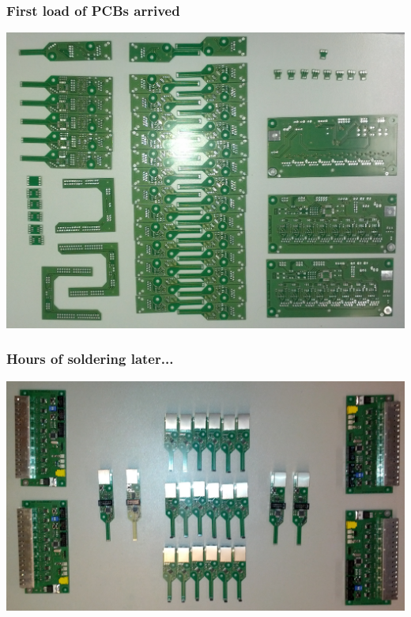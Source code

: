 \documentclass[t]{beamer}
\begin{document}
\begin{frame}[c]
    \frametitle{First load of PCBs arrived}
  \begin{center}
  	\includegraphics[width=0.8\linewidth]{img/pic/platinen_leer.jpg}\\
  \vspace{0.5cm}
  \end{center}
\end{frame}
\begin{frame}[c]
    \frametitle{Hours of soldering later...}
  \begin{center}
  	\includegraphics[width=0.8\linewidth]{img/pic/platinen_geloetet.jpg}\\
  \vspace{0.5cm}
  \end{center}
\end{frame}
\end{document}
